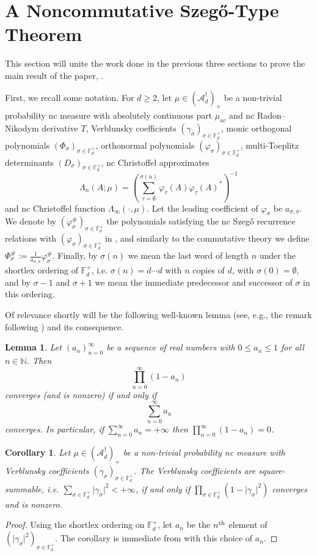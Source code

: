 \documentclass[11pt,reqno]{amsart}
\newcommand\ncm[1]{(\mathscr{A}_{#1}^{\dagger})_+}
\def\p{\varphi}
\def\g{\gamma}
\def\s{\sigma}
\def\t{\tau}
\def\L{\Lambda}
\def\P{\Phi}
\def\NN{\mathbb{N}}
\def\FF{\mathbb{F}}
\def\cA{\mathcal{A}}
\newtheorem{lemma}[theorem]{Lemma}
\newtheorem{corollary}[theorem]{Corollary}
\theoremstyle{definition}
\numberwithin{equation}{section}
\begin{document}
\section{A Noncommutative Szeg\H{o}-Type Theorem}

This section will unite the work done in the previous three sections to prove the main result of the paper, .

First, we recall some notation. For \(d \geq 2\), let \(\mu \in (\cA_d^\dagger)_+\) be a non-trivial probability nc measure with absolutely continuous part \(\mu_{ac}\) and nc Radon--Nikodym derivative \(T\), Verblunsky coefficients \((\g_\s)_{\s \in \FF_d^+}\), monic orthogonal polynomials \((\P_\s)_{\s \in \FF_d^+}\), orthonormal polynomials \((\p_\s)_{\s \in \FF_d^+}\), multi-Toeplitz determinants \((D_\s)_{\s \in \FF_d^+}\), nc Christoffel approximates 
\[
    \L_{n}(A; \mu) = \left(\sum_{\t = \emptyset}^{\s(n)} \p_{\t}(A)\p_{\t}(A)^*\right)^{-1}
\]
and nc Christoffel function \(\L_{\infty}(\cdot, \mu)\). Let the leading coefficient of \(\p_\s\) be \(a_{\s,\s}\). We denote by \((\p^{\#}_\s)_{\s \in \FF_d^+}\) the polynomials satisfying the nc Szeg\H{o} recurrence relations with \((\p_\s)_{\s \in \FF_d^+}\) in \cite[Theorem 3.2]{CJ02b}, and similarly to the commutative theory we define \(\P^{\#}_\s := \frac{1}{a_{\s,\s}}\p^{\#}_\s\). Finally, by \(\s(n)\) we mean the last word of length \(n\) under the shortlex ordering of \(\FF_d^+\), i.e. \(\s(n) = d\cdots d\) with \(n\) copies of \(d\), with \(\s(0) = \emptyset\), and by \(\s - 1\) and \(\s + 1\) we mean the immediate predecessor and successor of \(\s\) in this ordering.

Of relevance shortly will be the following well-known lemma (see, e.g., the remark following \cite[Lemma 3.3.5]{Kat04}) and its consequence. 

\begin{lemma}
    \label{lem:ProductSumConvergence}
    Let \((a_n)_{n=0}^{\infty}\) be a sequence of real numbers with \(0 \leq a_n \leq 1\) for all \(n \in \NN\). Then 
    \[
        \prod_{n=0}^{\infty} (1 - a_n)
    \]
    converges (and is nonzero) if and only if
    \[
        \sum_{n=0}^{\infty} a_n
    \]
    converges. In particular, if \(\sum_{n=0}^{\infty} a_n = +\infty\) then \(\prod_{n=0}^{\infty} (1 - a_n) = 0\).
\end{lemma} 

\begin{corollary}
    \label{cor:SquareSummableVCs}
    Let \(\mu \in \ncm{d}\) be a non-trivial probability nc measure with Verblunsky coefficients \((\g_\s)_{\s \in \FF_d^+}\). The Verblunsky coefficients are square-summable, i.e. \(\sum_{\s \in \FF_d^+} \lvert \g_\s \rvert^2 < +\infty\), if and only if \(\prod_{\s \in \FF_d^+} (1 - \lvert \g_\s \rvert^2)\) converges and is nonzero.
\end{corollary}
\begin{proof}
    Using the shortlex ordering on \(\FF_d^+\), let \(a_n\) be the \(n^{\rm{th}}\) element of \((\lvert \g_\s \rvert^2)_{\s \in \FF_d^+}\). The corollary is immediate from  with this choice of \(a_n\).
\end{proof}
\end{document}

